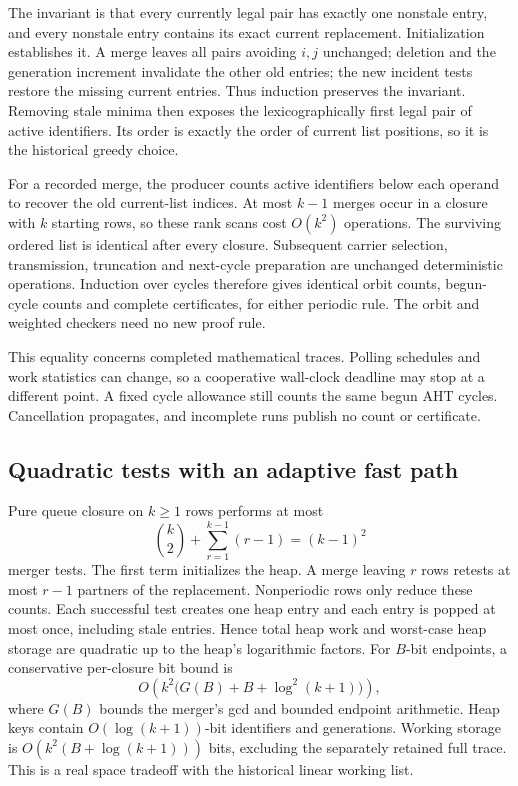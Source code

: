 The invariant is that every currently legal pair has exactly one nonstale
entry, and every nonstale entry contains its exact current replacement.
Initialization establishes it. A merge leaves all pairs avoiding $i,j$
unchanged; deletion and the generation increment invalidate the other old
entries; the new incident tests restore the missing current entries. Thus
induction preserves the invariant. Removing stale minima then exposes the
lexicographically first legal pair of active identifiers. Its order is exactly
the order of current list positions, so it is the historical greedy choice.

For a recorded merge, the producer counts active identifiers below each operand
to recover the old current-list indices. At most $k-1$ merges occur in a
closure with $k$ starting rows, so these rank scans cost $O(k^2)$ operations.
The surviving ordered list is identical after every closure. Subsequent
carrier selection, transmission, truncation and next-cycle preparation are
unchanged deterministic operations. Induction over cycles therefore gives
identical orbit counts, begun-cycle counts and complete certificates, for
either periodic rule. The orbit and weighted checkers need no new proof rule.

This equality concerns completed mathematical traces. Polling schedules and
work statistics can change, so a cooperative wall-clock deadline may stop at
a different point. A fixed cycle allowance still counts the same begun AHT
cycles. Cancellation propagates, and incomplete runs publish no count or
certificate.

\subsection{Quadratic tests with an adaptive fast path}

Pure queue closure on $k\ge1$ rows performs at most
\[
 \binom{k}{2}+\sum_{r=1}^{k-1}(r-1)=(k-1)^2
\]
merger tests. The first term initializes the heap. A merge leaving $r$ rows
retests at most $r-1$ partners of the replacement. Nonperiodic rows only
reduce these counts. Each successful test creates one heap entry and each
entry is popped at most once, including stale entries. Hence total heap work
and worst-case heap storage are quadratic up to the heap's logarithmic factors.
For $B$-bit endpoints, a conservative per-closure bit bound is
\[
 O\!\left(k^2\bigl(G(B)+B+\log^2(k+1)\bigr)\right),
\]
where $G(B)$ bounds the merger's gcd and bounded endpoint arithmetic. Heap
keys contain $O(\log(k+1))$-bit identifiers and generations. Working storage
is $O(k^2(B+\log(k+1)))$ bits, excluding the separately retained full trace.
This is a real space tradeoff with the historical linear working list.

